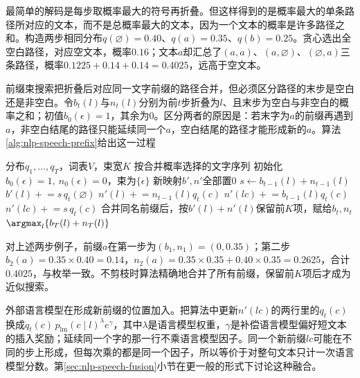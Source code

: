 最简单的解码是每步取概率最大的符号再折叠。但这样得到的是概率最大的单条路径所对应的文本，而不是总概率最大的文本，因为一个文本的概率是许多路径之和。构造两步相同分布$q(\varnothing)=0.40$、$q(a)=0.35$、$q(b)=0.25$。贪心选出全空白路径，对应空文本，概率$0.16$；文本$a$却汇总了$(a,a)$、$(a,\varnothing)$、$(\varnothing,a)$三条路径，概率$0.1225+0.14+0.14=0.4025$，远高于空文本。

前缀束搜索把折叠后对应同一文字前缀的路径合并，但必须区分路径的末步是空白还是非空白。令$b_t(l)$与$n_t(l)$分别为前$t$步折叠为$l$、且末步为空白与非空白的概率之和；初值$b_0(\epsilon)=1$，其余为0。区分两者的原因是：若末字为$a$的前缀再遇到$a$，非空白结尾的路径只能延续同一个$a$，空白结尾的路径才能形成新的$a$。算法\ref{alg:nlp-speech-prefix}给出这一过程

\begin{algorithm}[CTC前缀束搜索]
  \label{alg:nlp-speech-prefix}
  \begin{algorithmic}[1]
    \Require 分布$q_1,\ldots,q_T$，词表$V$，束宽$K$
    \Ensure 按合并概率选择的文字序列
    \State 初始化$b_0(\epsilon)=1,\ n_0(\epsilon)=0$，束为$\{\epsilon\}$
      \State 新映射$b',n'$全部置0
        \State $s\gets b_{t-1}(l)+n_{t-1}(l)$
        \State $b'(l)\mathrel{+}=s\,q_t(\varnothing)$ 
            \State $n'(l)\mathrel{+}=n_{t-1}(l)q_t(c)$ 
            \State $n'(lc)\mathrel{+}=b_{t-1}(l)q_t(c)$ 
          \Else
            \State $n'(lc)\mathrel{+}=s\,q_t(c)$
          \EndIf
        \EndFor
      \EndFor
      \State 合并同名前缀后，按$b'(l)+n'(l)$保留前$K$项，赋给$b_t,n_t$
    \EndFor
    \State \Return $\argmax_l\{b_T(l)+n_T(l)\}$
  \end{algorithmic}
\end{algorithm}

对上述两步例子，前缀$a$在第一步为$(b_1,n_1)=(0,0.35)$；第二步$b_2(a)=0.35\times0.40=0.14$，$n_2(a)=0.35\times0.35+0.40\times0.35=0.2625$，合计$0.4025$，与枚举一致。不剪枝时算法精确地合并了所有前缀，保留前$K$项后才成为近似搜索。

外部语言模型在形成新前缀的位置加入。把算法中更新$n'(lc)$的两行里的$q_t(c)$换成$q_t(c)\,p_{\mathrm{lm}}(c\mid l)^{\lambda}e^{\gamma}$，其中$\lambda$是语言模型权重，$\gamma$是补偿语言模型偏好短文本的插入奖励；延续同一个字的那一行不乘语言模型因子。同一个新前缀$lc$可能在不同的步上形成，但每次乘的都是同一个因子，所以等价于对整句文本只计一次语言模型分数。第\ref{sec:nlp-speech-fusion}小节在更一般的形式下讨论这种融合。

